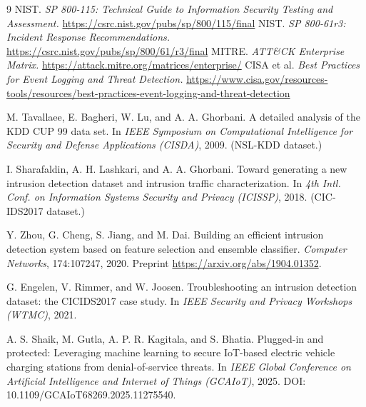 \documentclass[11pt]{article}
\begin{document}
\begin{thebibliography}{9}
 NIST. \emph{SP 800-115: Technical Guide to Information
Security Testing and Assessment.} \url{https://csrc.nist.gov/pubs/sp/800/115/final}
 NIST. \emph{SP 800-61r3: Incident Response Recommendations.}
\url{https://csrc.nist.gov/pubs/sp/800/61/r3/final}
 MITRE. \emph{ATT\&CK Enterprise Matrix.}
\url{https://attack.mitre.org/matrices/enterprise/}
 CISA et al. \emph{Best Practices for Event Logging and Threat
Detection.} \url{https://www.cisa.gov/resources-tools/resources/best-practices-event-logging-and-threat-detection}

 M. Tavallaee, E. Bagheri, W. Lu, and A. A. Ghorbani.
\newblock A detailed analysis of the KDD CUP 99 data set.
\newblock In \emph{IEEE Symposium on Computational Intelligence for Security and
Defense Applications (CISDA)}, 2009. (NSL-KDD dataset.)

 I. Sharafaldin, A. H. Lashkari, and A. A. Ghorbani.
\newblock Toward generating a new intrusion detection dataset and intrusion
traffic characterization.
\newblock In \emph{4th Intl. Conf. on Information Systems Security and Privacy
(ICISSP)}, 2018. (CIC-IDS2017 dataset.)

 Y. Zhou, G. Cheng, S. Jiang, and M. Dai.
\newblock Building an efficient intrusion detection system based on feature
selection and ensemble classifier.
\newblock \emph{Computer Networks}, 174:107247, 2020. Preprint
\url{https://arxiv.org/abs/1904.01352}.

 G. Engelen, V. Rimmer, and W. Joosen.
\newblock Troubleshooting an intrusion detection dataset: the CICIDS2017 case
study.
\newblock In \emph{IEEE Security and Privacy Workshops (WTMC)}, 2021.

 A. S. Shaik, M. Gutla, A. P. R. Kagitala, and S. Bhatia.
\newblock Plugged-in and protected: Leveraging machine learning to secure
IoT-based electric vehicle charging stations from denial-of-service threats.
\newblock In \emph{IEEE Global Conference on Artificial Intelligence and Internet
of Things (GCAIoT)}, 2025. DOI: 10.1109/GCAIoT68269.2025.11275540.

\end{thebibliography}
\end{document}

